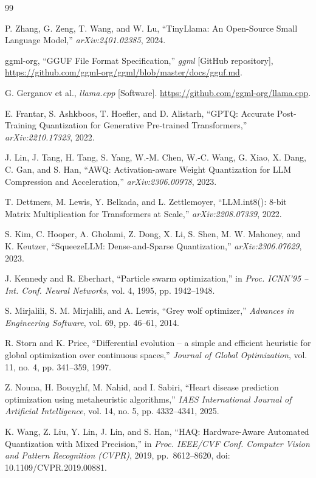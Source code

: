 \documentclass[conference, letterpaper]{IEEEtran}
\begin{document}

\begin{thebibliography}{99}

 P. Zhang, G. Zeng, T. Wang, and W. Lu, ``TinyLlama: An Open-Source Small Language Model,'' \emph{arXiv:2401.02385}, 2024.

 ggml-org, ``GGUF File Format Specification,'' \emph{ggml} [GitHub repository], \url{https://github.com/ggml-org/ggml/blob/master/docs/gguf.md}.

 G. Gerganov et al., \emph{llama.cpp} [Software]. \url{https://github.com/ggml-org/llama.cpp}.

 E. Frantar, S. Ashkboos, T. Hoefler, and D. Alistarh, ``GPTQ: Accurate Post-Training Quantization for Generative Pre-trained Transformers,'' \emph{arXiv:2210.17323}, 2022.

 J. Lin, J. Tang, H. Tang, S. Yang, W.-M. Chen, W.-C. Wang, G. Xiao, X. Dang, C. Gan, and S. Han, ``AWQ: Activation-aware Weight Quantization for LLM Compression and Acceleration,'' \emph{arXiv:2306.00978}, 2023.

 T. Dettmers, M. Lewis, Y. Belkada, and L. Zettlemoyer, ``LLM.int8(): 8-bit Matrix Multiplication for Transformers at Scale,'' \emph{arXiv:2208.07339}, 2022.

 S. Kim, C. Hooper, A. Gholami, Z. Dong, X. Li, S. Shen, M. W. Mahoney, and K. Keutzer, ``SqueezeLLM: Dense-and-Sparse Quantization,'' \emph{arXiv:2306.07629}, 2023.

 J. Kennedy and R. Eberhart, ``Particle swarm optimization,'' in \emph{Proc. ICNN'95 -- Int. Conf. Neural Networks}, vol. 4, 1995, pp. 1942--1948.

 S. Mirjalili, S. M. Mirjalili, and A. Lewis, ``Grey wolf optimizer,'' \emph{Advances in Engineering Software}, vol. 69, pp. 46--61, 2014.

 R. Storn and K. Price, ``Differential evolution -- a simple and efficient heuristic for global optimization over continuous spaces,'' \emph{Journal of Global Optimization}, vol. 11, no. 4, pp. 341--359, 1997.

 Z. Nouna, H. Bouyghf, M. Nahid, and I. Sabiri, ``Heart disease prediction optimization using metaheuristic algorithms,'' \emph{IAES International Journal of Artificial Intelligence}, vol. 14, no. 5, pp. 4332--4341, 2025.

 K. Wang, Z. Liu, Y. Lin, J. Lin, and S. Han, ``HAQ: Hardware-Aware Automated Quantization with Mixed Precision,'' in \emph{Proc. IEEE/CVF Conf. Computer Vision and Pattern Recognition (CVPR)}, 2019, pp.~8612--8620, doi: 10.1109/CVPR.2019.00881.


\end{thebibliography}
\end{document}
